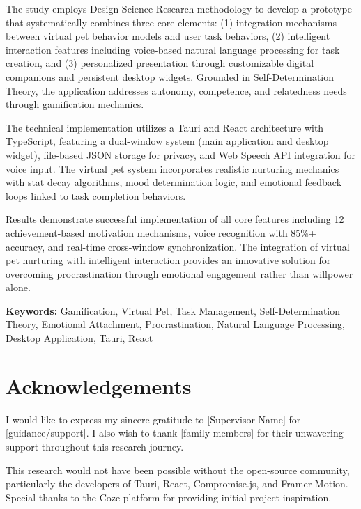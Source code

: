 \documentclass[12pt,a4paper]{report}
\begin{document}
The study employs Design Science Research methodology to develop a prototype that systematically combines three core elements: (1) integration mechanisms between virtual pet behavior models and user task behaviors, (2) intelligent interaction features including voice-based natural language processing for task creation, and (3) personalized presentation through customizable digital companions and persistent desktop widgets. Grounded in Self-Determination Theory, the application addresses autonomy, competence, and relatedness needs through gamification mechanics.

The technical implementation utilizes a Tauri and React architecture with TypeScript, featuring a dual-window system (main application and desktop widget), file-based JSON storage for privacy, and Web Speech API integration for voice input. The virtual pet system incorporates realistic nurturing mechanics with stat decay algorithms, mood determination logic, and emotional feedback loops linked to task completion behaviors.

Results demonstrate successful implementation of all core features including 12 achievement-based motivation mechanisms, voice recognition with 85\%+ accuracy, and real-time cross-window synchronization. The integration of virtual pet nurturing with intelligent interaction provides an innovative solution for overcoming procrastination through emotional engagement rather than willpower alone.

\textbf{Keywords:} Gamification, Virtual Pet, Task Management, Self-Determination Theory, Emotional Attachment, Procrastination, Natural Language Processing, Desktop Application, Tauri, React

\chapter*{Acknowledgements}

I would like to express my sincere gratitude to [Supervisor Name] for [guidance/support]. I also wish to thank [family members] for their unwavering support throughout this research journey.

This research would not have been possible without the open-source community, particularly the developers of Tauri, React, Compromise.js, and Framer Motion. Special thanks to the Coze platform for providing initial project inspiration.

\tableofcontents
\listoffigures
\listoftables













\end{document}
